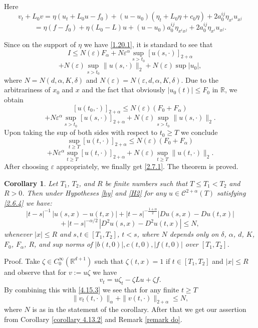 \documentclass[reqno,12pt]{amsart}
\newtheorem{corollary}[theorem]{Corollary}
\theoremstyle{definition}
\theoremstyle{remark}
\begin{document}
Here
$$
v_{t}+L_{0}v =
\eta(u_{t}+L_{0}u-f_{0})+(u-u_{0})(\eta_{t}+L_{0}\eta+c_{0}\eta)
+2a^{ij}_{0}\eta_{x^{i}}u_{x^{j}}
$$
$$
=\eta (f-f_{0})+ \eta (L_{0}-L
)u+(u-u_{0})a^{ij}_{0}\eta_{x^{i}x^{j}}
+2a^{ij}_{0}\eta_{x^{i}}u_{x^{j}} .
$$

Since on the support of $\eta$ we have \eqref{1.20.1}, it is
standard to see that
$$
I\leq N(\varepsilon)F_{\alpha}+N\varepsilon^{\alpha}\sup_{s>t_{0}}
[u(s,\cdot)]_{2+\alpha}
$$
$$
+N(\varepsilon)\sup_{s>t_{0}}\|u(s,\cdot)\|_{2}
+N(\varepsilon)\sup|u_{0}|,
$$
where $N=N(d,\alpha,K,\delta)$ and  $N(\varepsilon)=N(
\varepsilon,d,\alpha,K,\delta)$. Due to the arbitrariness of
$x_{0}$ and $x$  and the fact that  obviously
   $|u_{0}(t)| \leq F_{0}$   in ${\mathbb{R}}$,  we
obtain
$$
[u(t_{0},\cdot)]_{2+\alpha}\leq N(\varepsilon)(F_{0}+F_{\alpha})
$$
$$
+N\varepsilon^{\alpha}\sup_{s>t_{0}} [u(s,\cdot)]_{2+\alpha}
+N(\varepsilon)\sup_{s>t_{0}}\|u(s,\cdot)\|_{2}.
$$
Upon taking the sup of both sides with respect to $t_{0}\ge  T$ we
conclude
$$
\sup_{t \ge  T}[u(t,\cdot)]_{2+\alpha}\leq
N(\varepsilon)(F_{0}+F_{\alpha})
$$
$$
+N\varepsilon^{\alpha}\sup_{t\ge  T} [u(t,\cdot)]_{2+\alpha}
+N(\varepsilon)\sup_{t\ge  T}\|u(t,\cdot)\|_{2}.
$$
After choosing $\varepsilon$ appropriately, we finally get
\eqref{2.7.1}. The theorem is proved.

\begin{corollary}
                                            \label{corollary 4.15.3}
Let $T_{1}$, $T_{2}$, and $R $ be finite numbers such that $T\leq
T_{1}<T_{2}$ and    $R>0$. 
Then under
   Hypotheses \ref{hy} and \ref{H2} 
for any   $u\in{\mathcal{C}}^{2+\alpha}(T)$ satisfying \eqref{2.6.4}
we have:  
$$|t-s|^{-1}
\, |u(s,x)-u(t,x)|+  |t-s|^{- \frac{1+ \alpha}{2}} |Du(s,x)- D
u(t,x)|
$$
\begin{equation}                                      \label{tt}
+ \, |t-s|^{- \alpha/2} \, |D^2u(s,x)- D^2u (t,x)|\leq N,
\end{equation}
  whenever $|x|\leq R$ and $s,t\in[T_{1},T_{2}]$,  
$t<s$,  where $N$ depends only on $\delta$, $\alpha$, $d$, $K$,
$F_{0}$, $F_{\alpha}$, $R$, and sup norms of
$|b(t,0)|,c(t,0),|f(t,0)|$ over $[T_{1},T_{2}]$.
\end{corollary}
    Proof.
   Take   $\zeta\in C^{\infty}_{0}({\mathbb{R}}^{d+1})$ such that
$\zeta(t,x)=1$ if  $t\in[T_{1},T_{2}]$ and $|x|\leq R$ and observe
that for $v:=u\zeta$  we have
$$
v_{t}=u\zeta_{t}-\zeta Lu+\zeta f.
$$
By combining this with \eqref{4.15.3} we see that
for any finite $t\geq T$
$$
 \|v_{t}(t,\cdot)\|_{\alpha}+ \|v(t,\cdot) \|_{2+\alpha}\leq N,
$$
where $N$ is as in the statement of the corollary. After that we
get our assertion from  Corollary \ref{corollary 4.13.2} and
Remark \ref{remark do}.
\end{document}
